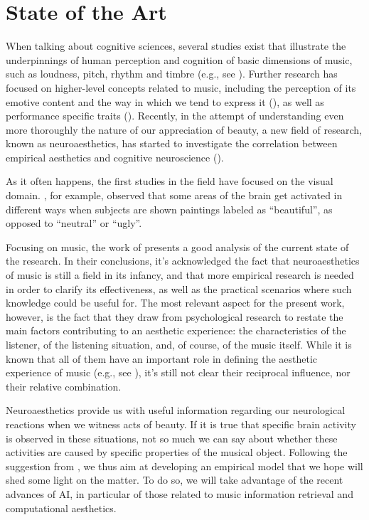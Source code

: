 \chapter{State of the Art}\label{ch:sota}
When talking about cognitive sciences, several studies exist that illustrate the underpinnings of human perception and cognition of basic dimensions of music, such as loudness, pitch, rhythm and timbre (e.g., see \cite{justus2002music}). Further research has focused on higher-level concepts related to music, including the perception of its emotive content and the way in which we tend to express it (\cite{juslin2004expression}), as well as performance specific traits (\cite{palmer1997music}). Recently, in the attempt of understanding even more thoroughly the nature of our appreciation of beauty, a new field of research, known as neuroaesthetics, has started to investigate the correlation between empirical aesthetics and cognitive neuroscience (\cite{pearce2016neuroaesthetics}).

As it often happens, the first studies in the field have focused on the visual domain. \cite{kawabata2004neural}, for example, observed that some areas of the brain get activated in different ways when subjects are shown paintings labeled as ``beautiful'', as opposed to ``neutral'' or ``ugly''.

Focusing on music, the work of \cite{brattico2013neuroaesthetics} presents a good analysis of the current state of the research. In their conclusions, it’s acknowledged the fact that neuroaesthetics of music is still a field in its infancy, and that more empirical research is needed in order to clarify its effectiveness, as well as the practical scenarios where such knowledge could be useful for. The most relevant aspect for the present work, however, is the fact that they draw from psychological research to restate the main factors contributing to an aesthetic experience: the characteristics of the listener, of the listening situation, and, of course, of the music itself. While it is known that all of them have an important role in defining the aesthetic experience of music (e.g., see \cite{hargreaves201021}), it’s still not clear their reciprocal influence, nor their relative combination. 

Neuroaesthetics provide us with useful information regarding our neurological reactions when we witness acts of beauty. If it is true that specific brain activity is observed in these situations, not so much we can say about whether these activities are caused by specific properties of the musical object. Following the suggestion from \citeauthor{brattico2013neuroaesthetics}, we thus aim at developing an empirical model that we hope will shed some light on the matter. To do so, we will take advantage of the recent advances of AI, in particular of those related to music information retrieval and computational aesthetics.

